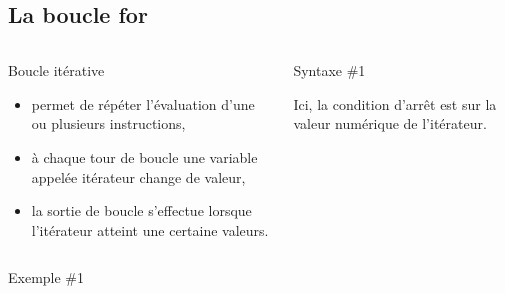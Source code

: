 \subsection{La boucle for}
\begin{frame}{}
  \begin{columns}
    \begin{column}{5cm}
      \begin{block}{ Boucle itérative}
        \begin{itemize}
        \item permet de répéter l'évaluation d'une ou plusieurs instructions,
        \item à chaque tour de boucle une variable appelée itérateur change de valeur,
        \item la sortie de boucle s'effectue lorsque l'itérateur atteint une certaine valeurs.
        \end{itemize}
      \end{block}
    \end{column}
    \begin{column}{6cm}
      \begin{block}{Syntaxe \#1}
        \begin{center}
        \end{center}
        Ici, la condition d'arrêt est sur la valeur numérique de l'itérateur.
      \end{block}
    \end{column}
  \end{columns}
  \begin{block}{Exemple \#1}
    \small{%
      \begin{columns}
        \begin{column}{5cm}
        \end{column}
        \begin{column}{5.5cm}
        \end{column}
      \end{columns}
    }
  \end{block}
\end{frame}
